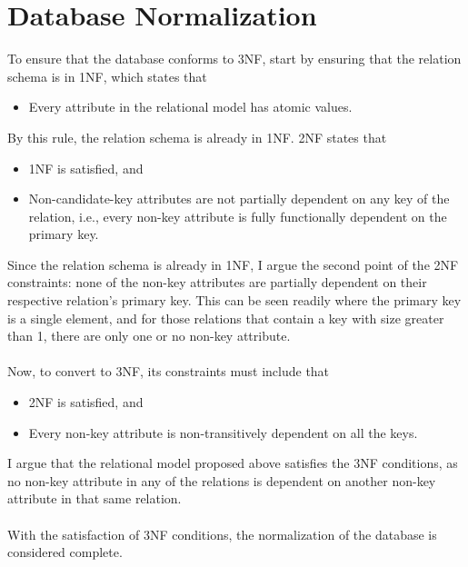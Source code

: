 \documentclass{paper}
\begin{document}
	\section{Database Normalization}
	To ensure that the database conforms to 3NF, start by ensuring that the relation schema is in 1NF, which states that
	\begin{itemize}
		\item Every attribute in the relational model has atomic values.
	\end{itemize}
	By this rule, the relation schema is already in 1NF. 2NF states that
	\begin{itemize}
		\item 1NF is satisfied, and
		\item Non-candidate-key attributes are not partially dependent on any key of the relation, i.e., every non-key attribute is fully functionally dependent on the primary key.
	\end{itemize}
	Since the relation schema is already in 1NF, I argue the second point of the 2NF constraints: none of the non-key attributes are partially dependent on their respective relation's primary key. This can be seen readily where the primary key is a single element, and for those relations that contain a key with  size greater than 1, there are only one or no non-key attribute.\\\\
	Now, to convert to 3NF, its constraints must include that
	\begin{itemize}
		\item 2NF is satisfied, and
		\item Every non-key attribute is non-transitively dependent on all the keys.
	\end{itemize}
	I argue that the relational model proposed above satisfies the 3NF conditions, as no non-key attribute in any of the relations is dependent on another non-key attribute in that same relation.\\\\
	With the satisfaction of 3NF conditions, the normalization of the database is considered complete.
	
\end{document}

